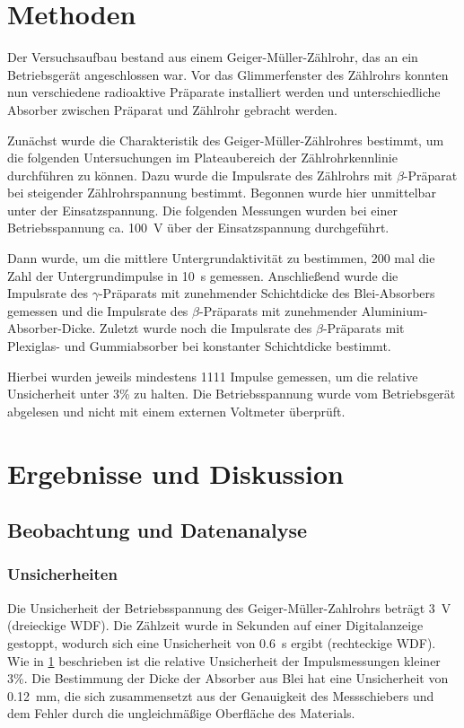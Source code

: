 \documentclass[
	a4paper,
	12pt,
	pagesize,
	ngerman
]{scrartcl}
\begin{document}
	\section{Methoden}\label{Methoden}
	Der Versuchsaufbau bestand aus einem Geiger-Müller-Zählrohr, das an ein Betriebsgerät angeschlossen war.
	Vor das Glimmerfenster des Zählrohrs konnten nun verschiedene radioaktive Präparate installiert werden und unterschiedliche Absorber zwischen Präparat und Zählrohr gebracht werden.
	
	Zunächst wurde die Charakteristik des Geiger-Müller-Zählrohres bestimmt, um die folgenden Untersuchungen im Plateaubereich der Zählrohrkennlinie durchführen zu können.
	Dazu wurde die Impulsrate des Zählrohrs mit $\beta$-Präparat bei steigender Zählrohrspannung bestimmt.
	Begonnen wurde hier unmittelbar unter der Einsatzspannung.
	Die folgenden Messungen wurden bei einer Betriebsspannung ca. \SI{100}{\volt} über der Einsatzspannung durchgeführt.
	
	Dann wurde, um die mittlere Untergrundaktivität zu bestimmen, 200 mal die Zahl der Untergrundimpulse in \SI{10}{\second} gemessen.
	Anschließend wurde die Impulsrate des $\gamma$-Präparats mit zunehmender Schichtdicke des Blei-Absorbers gemessen und die Impulsrate des $\beta$-Präparats mit zunehmender Aluminium-Absorber-Dicke.
	Zuletzt wurde noch die Impulsrate des $\beta$-Präparats mit Plexiglas- und Gummiabsorber bei konstanter Schichtdicke bestimmt.
	
	Hierbei wurden jeweils mindestens 1111 Impulse gemessen, um die relative Unsicherheit unter 3\% zu halten.
	Die Betriebsspannung wurde vom Betriebsgerät abgelesen und nicht mit einem externen Voltmeter überprüft.
	
	
	\section{Ergebnisse und Diskussion}
	

	
	\subsection{Beobachtung und Datenanalyse}
	\subsubsection{Unsicherheiten} %
	Die Unsicherheit der Betriebsspannung des Geiger-Müller-Zahlrohrs beträgt \SI{3}{V} (dreieckige WDF).  
	Die Zählzeit wurde in Sekunden auf einer Digitalanzeige gestoppt, wodurch sich eine Unsicherheit von \SI{0,6}{s} ergibt (rechteckige WDF).
	Wie in \cref{Methoden} beschrieben ist die relative Unsicherheit der Impulsmessungen kleiner 3\%.
	Die Bestimmung der Dicke der Absorber aus Blei hat eine Unsicherheit von \SI{0,12}{mm}, die sich zusammensetzt aus der Genauigkeit des Messschiebers und dem Fehler durch die ungleichmäßige Oberfläche des Materials.
	
\end{document}
